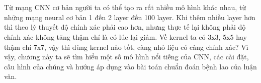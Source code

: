 \setcounter{chapter}{1}
\setcounter{section}{1}
\chapter{\tenchuongii}
Từ mạng CNN cơ bản người ta có thể tạo ra rất nhiều mô hình khác nhau, từ những mạng neural cơ bản 1 đến 2 layer đến 100 layer. Khi thêm nhiều layer hơn thì theo lý thuyết độ chính xác phải cao hơn, nhưng thực tế lại không phải độ chính xác không tăng thậm chí là có lúc lại giảm. Về kernel ta có 3x3, 5x5 hay thậm chí 7x7, vậy thì dùng kernel nào tốt, càng nhỏ liệu có càng chính xác? Vì vậy, chương này ta sẽ tìm hiểu một số mô hình nổi tiếng của CNN, các cài đặt, cấu hình của chúng và hướng áp dụng vào bài toán chuẩn đoán bệnh lao của luận văn.




	 
	 
